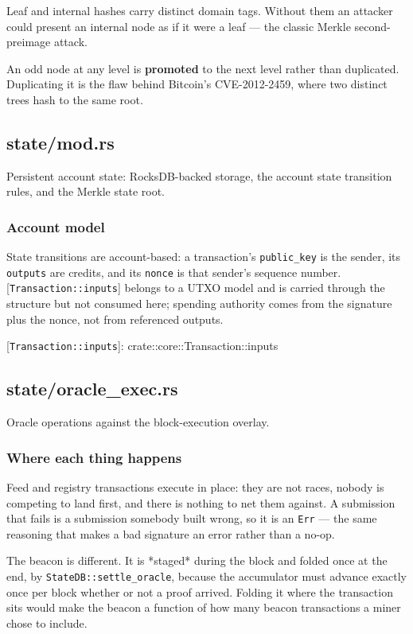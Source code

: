 \documentclass[11pt,a4paper]{article}
\begin{document}
Leaf and internal hashes carry distinct domain tags. Without them an
attacker could present an internal node as if it were a leaf — the classic
Merkle second-preimage attack.

An odd node at any level is \textbf{promoted} to the next level rather than
duplicated. Duplicating it is the flaw behind Bitcoin's CVE-2012-2459, where
two distinct trees hash to the same root.

\subsection{state/mod.rs}
Persistent account state: RocksDB-backed storage, the account state
transition rules, and the Merkle state root.

\subsubsection{Account model}

State transitions are account-based: a transaction's \texttt{public\_key} is the
sender, its \texttt{outputs} are credits, and its \texttt{nonce} is that sender's sequence
number. [\texttt{Transaction::inputs}] belongs to a UTXO model and is carried
through the structure but not consumed here; spending authority comes from
the signature plus the nonce, not from referenced outputs.

[\texttt{Transaction::inputs}]: crate::core::Transaction::inputs

\subsection{state/oracle\_exec.rs}
Oracle operations against the block-execution overlay.

\subsubsection{Where each thing happens}

Feed and registry transactions execute in place: they are not races, nobody
is competing to land first, and there is nothing to net them against. A
submission that fails is a submission somebody built wrong, so it is an
\texttt{Err} — the same reasoning that makes a bad signature an error rather than a
no-op.

The beacon is different. It is *staged* during the block and folded once at
the end, by \texttt{StateDB::settle\_oracle}, because the accumulator must advance
exactly once per block whether or not a proof arrived. Folding it where the
transaction sits would make the beacon a function of how many beacon
transactions a miner chose to include.
\end{document}
